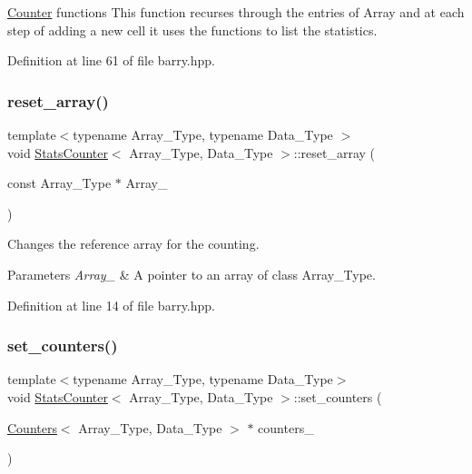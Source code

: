 \hyperlink{classbarry_1_1_counter}{Counter} functions This function recurses through the entries of {\ttfamily Array} and at each step of adding a new cell it uses the functions to list the statistics. 



Definition at line 61 of file barry.\+hpp.

\mbox{\label{classbarry_1_1_stats_counter_a8dabc3a7a9931acbb76900a67d728f70}} 
\subsubsection{\texorpdfstring{reset\+\_\+array()}{reset\_array()}}
{\footnotesize\ttfamily template$<$typename Array\+\_\+\+Type, typename Data\+\_\+\+Type $>$ \\
void \hyperlink{classbarry_1_1_stats_counter}{Stats\+Counter}$<$ Array\+\_\+\+Type, Data\+\_\+\+Type $>$\+::reset\+\_\+array (\begin{DoxyParamCaption}\item[{const Array\+\_\+\+Type $\ast$}]{Array\+\_\+ }\end{DoxyParamCaption})\hspace{0.3cm}{\ttfamily [inline]}}



Changes the reference array for the counting. 


\begin{DoxyParams}{Parameters}
{\em Array\+\_\+} & A pointer to an array of class {\ttfamily Array\+\_\+\+Type}. \\
\hline
\end{DoxyParams}


Definition at line 14 of file barry.\+hpp.

\mbox{\label{classbarry_1_1_stats_counter_a1d66f7d7326cac60a46ee56a8eb0a497}} 
\subsubsection{\texorpdfstring{set\+\_\+counters()}{set\_counters()}}
{\footnotesize\ttfamily template$<$typename Array\+\_\+\+Type, typename Data\+\_\+\+Type$>$ \\
void \hyperlink{classbarry_1_1_stats_counter}{Stats\+Counter}$<$ Array\+\_\+\+Type, Data\+\_\+\+Type $>$\+::set\+\_\+counters (\begin{DoxyParamCaption}\item[{\hyperlink{classbarry_1_1_counters}{Counters}$<$ Array\+\_\+\+Type, Data\+\_\+\+Type $>$ $\ast$}]{counters\+\_\+ }\end{DoxyParamCaption})\hspace{0.3cm}{\ttfamily [inline]}}



